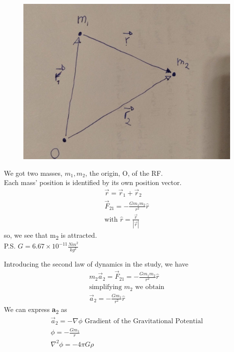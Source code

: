 \documentclass{report}
\begin{document}
\noindent
\begin{figure}[ht]
\begin{minipage}[ht]{0.45\textwidth}
    \vspace*{0pt} 
    \includegraphics[width=\linewidth]{imm/ei_to_new.jpg} 
    \vspace{12pt}
\end{minipage}
\end{figure}
\begin{minipage}[t]{0.48\textwidth}
    \vspace*{0pt} 
      We got two masses, $ m_{1}, m_{2} $, the origin, O, of the RF. \\ Each mass' position is identified by its own position vector.
	\begin{gather*}
\vec{r} = \vec{r}_{1}+\vec{r}_{2} \\
\vec{F}_{21}= - \frac{Gm_{1}m_{2}}{r^{2}} \hat{r} \\
\text{with } \hat{r} = \frac{\vec{r}}{|\vec{r}|}
	\end{gather*}
	   so, we see that m\textsubscript{2} is attracted. \\
	   P.S. $G = 6.67\times10^{-11} \frac{Nm^{2}}{kg^{2}} $
\end{minipage}

Introducing the second law of dynamics in the study, we have
\begin{gather*}
m_{2}\vec{a}_{2} = \vec{F}_{21} = - \frac{Gm_{1}m_{2}}{r^{2}} \hat{r} \\
\text{simplifying } m_{2} \text{ we obtain} \\
\vec{a}_{2} = - \frac{Gm_{1}}{r^{2}} \hat{r}  
\end{gather*}
We can express \textbf{a}\textsubscript{2} as 
\begin{gather*}
	\vec{a}_{2} = - \nabla \phi \text{ Gradient of the Gravitational Potential} \\
	\phi = - \frac{Gm_{1}}{r} \\
	\nabla^{2} \phi = -4\pi G \rho
\end{gather*}
\end{document}
